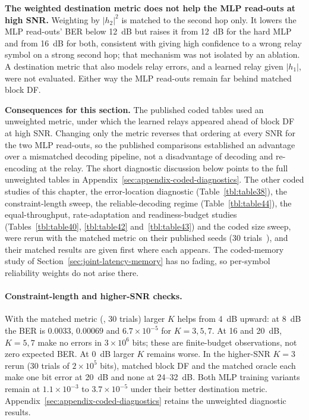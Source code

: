 \textbf{The weighted destination metric does not help the MLP read-outs at high SNR.} Weighting by $|h_2|^{2}$ is matched to the second hop only. It lowers the MLP read-outs' BER below 12~dB but raises it from 12~dB for the hard MLP and from 16~dB for both, consistent with giving high confidence to a wrong relay symbol on a strong second hop; that mechanism was not isolated by an ablation. A destination metric that also models relay errors, and a learned relay given $|h_1|$, were not evaluated. Either way the MLP read-outs remain far behind matched block DF.

\textbf{Consequences for this section.} The published coded tables used an unweighted metric, under which the learned relays appeared ahead of block DF at high SNR. Changing only the metric reverses that ordering at every SNR for the two MLP read-outs, so the published comparisons established an advantage over a mismatched decoding pipeline, not a disadvantage of decoding and re-encoding at the relay. The short diagnostic discussion below points to the full unweighted tables in Appendix~\ref{sec:appendix-coded-diagnostics}. The other coded studies of this chapter, the error-location diagnostic (Table~\ref{tbl:table38}), the constraint-length sweep, the reliable-decoding regime (Table~\ref{tbl:table44}), the equal-throughput, rate-adaptation and readiness-budget studies (Tables~\ref{tbl:table40}, \ref{tbl:table42} and~\ref{tbl:table43}) and the coded size sweep, were rerun with the matched metric on their published seeds (30 trials~), and their matched results are given first where each appears. The coded-memory study of Section~\ref{sec:joint-latency-memory} has no fading, so per-symbol reliability weights do not arise there.

\paragraph{Constraint-length and higher-SNR checks.} With the matched metric (, 30 trials) larger $K$ helps from 4~dB upward: at 8~dB the BER is $0.0033$, $0.00069$ and $6.7\times10^{-5}$ for $K=3,5,7$. At 16 and 20~dB, $K=5,7$ make no errors in $3\times10^6$ bits; these are finite-budget observations, not zero expected BER. At 0~dB larger $K$ remains worse. In the higher-SNR $K=3$ rerun (30 trials of $2\times10^5$ bits), matched block DF and the matched oracle each make one bit error at 20~dB and none at 24--32~dB. Both MLP training variants remain at $1.1\times10^{-3}$ to $3.7\times10^{-5}$ under their better destination metric. Appendix~\ref{sec:appendix-coded-diagnostics} retains the unweighted diagnostic results.

